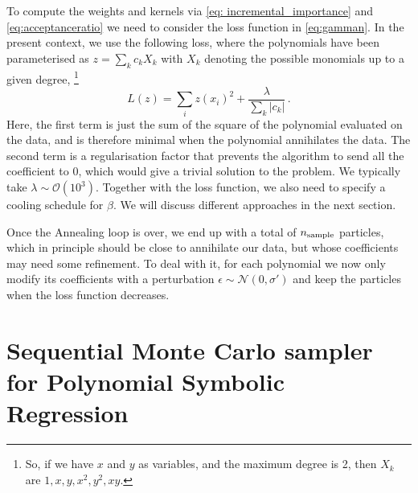 \documentclass[11pt,a4paper]{article}
\newcommand{\bd}[1]{\marginpar{\parbox{\marginparwidth}{\boldmath $\Longleftarrow$}}{\boldmath\bfseries (bd: #1)}}
\begin{document}
		To compute the weights and kernels via \eqref{eq: incremental_importance} and \eqref{eq:acceptanceratio} we need to consider the loss function in \eqref{eq:gamman}.
In the present context, we use the following loss, where the polynomials have been parameterised as $z = \sum_k c_k X_k$ with $X_k$ denoting the possible monomials up to a given degree,%
\footnote{So, if we have $x$ and $y$ as variables, and the maximum degree is 2, then $X_k$ are $1, x, y, x^2, y^2, x y$.}
		\begin{equation} \label{eq:lossreg}
			L(z) = \sum_{i} z(x_i)^2 + \frac{\lambda}{\sum_k |c_k|}\,.
		\end{equation}
Here, the first term is just the sum of the square of the polynomial evaluated on the data, and is therefore minimal when the polynomial annihilates the data. 
The second term is a regularisation factor that prevents the algorithm to send all the coefficient to 0, which would give a trivial solution to the problem. 
We typically take $\lambda \sim \mathcal{O}(10^3)$. 
Together with the loss function, we also need to specify a cooling schedule for $\beta$. We will discuss different approaches in the next section.
		
		Once the Annealing loop is over, we end up with a total of $n_{\rm sample}$ particles, which in principle should be close to annihilate our data, but whose coefficients may need some refinement. To deal with it, for each polynomial we now only modify its coefficients with a perturbation $\epsilon \sim \mathcal{N}(0, \sigma')$ and keep the particles when the loss function decreases.




\section{Sequential Monte Carlo sampler for Polynomial Symbolic Regression} \label{Sec:AIS-SMC}
\end{document}
